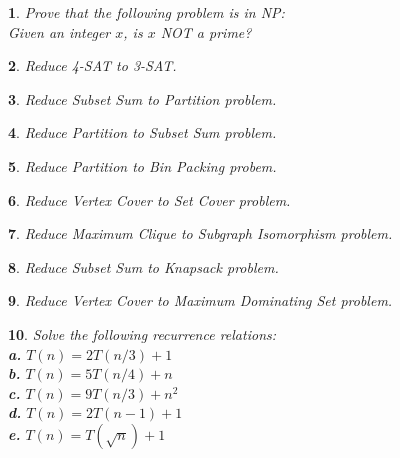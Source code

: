 \documentclass[%
addpoints]{exam}
\theoremstyle{problem}
\newtheorem{p}{}
\begin{document}
\begin{p}
Prove that the following problem is in NP:\\ 
\hspace{9pt}Given an integer $x$, is $x$ NOT a prime?
\hfill \end{p}

\begin{p} 
Reduce 4-SAT to 3-SAT.
\hfill \end{p}

\begin{p}
Reduce Subset Sum to Partition problem.
\hfill \end{p}

\begin{p} 
Reduce Partition to Subset Sum problem.
\hfill \end{p}

\begin{p}
Reduce Partition to Bin Packing probem.
\hfill \end{p}

\begin{p}
Reduce Vertex Cover to Set Cover problem.
\hfill \end{p}

\begin{p}
Reduce Maximum Clique to Subgraph Isomorphism problem.
\hfill \end{p}

\begin{p}
Reduce Subset Sum to Knapsack problem.
\hfill \end{p}

\begin{p}
Reduce Vertex Cover to Maximum Dominating Set problem.
\hfill \end{p}

\begin{p}
Solve the following recurrence relations:\\
\vspace{10pt}
\textbf{a.} \( T(n) = 2T(n/3) + 1 \)\\
\textbf{b.} \( T(n) = 5T(n/4) + n \)\\
\textbf{c.} \( T(n) = 9T(n/3) + n^2 \)\\
\textbf{d.} \( T(n) = 2T(n-1) + 1 \)\\
\textbf{e.} \( T(n) = T(\sqrt{n}) + 1 \)\\
\hfill \end{p}
\end{document}
